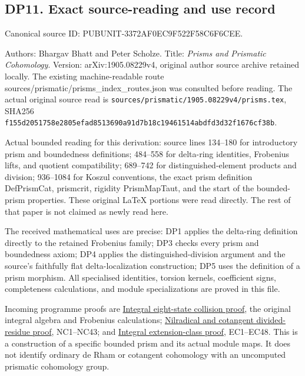 \documentclass[
  10pt,
  a4paper,
]{article}
\begin{document}
\subsection{DP11. Exact source-reading and use
record}\label{dp11.-exact-source-reading-and-use-record}

Canonical source ID: PUBUNIT-3372AF0EC9F522F58C6F6CEE.

Authors: Bhargav Bhatt and Peter Scholze. Title: \emph{Prisms and
Prismatic Cohomology}. Version: arXiv:1905.08229v4, original author
source archive retained locally. The existing machine-readable route
sources/prismatic/prisms\_index\_routes.json was consulted before
reading. The actual original source read is
\texttt{sources/\allowbreak{}prismatic/\allowbreak{}1905.\allowbreak{}08229v4/\allowbreak{}prisms.\allowbreak{}tex}, SHA256
\texttt{f155d205\allowbreak{}1758e280\allowbreak{}5efad851\allowbreak{}3690a91d\allowbreak{}7b18c194\allowbreak{}61514abd\allowbreak{}fd3d32f1\allowbreak{}676cf38b}.

Actual bounded reading for this derivation: source lines 134--180 for
introductory prism and boundedness definitions; 484--558 for delta-ring
identities, Frobenius lifts, and quotient compatibility; 689--742 for
distinguished-element products and division; 936--1084 for Koszul
conventions, the exact prism definition DefPrismCat, prismcrit, rigidity
PrismMapTaut, and the start of the bounded-prism properties. These
original LaTeX portions were read directly. The rest of that paper is
not claimed as newly read here.

The received mathematical uses are precise: DP1 applies the delta-ring
definition directly to the retained Frobenius family; DP3 checks every
prism and boundedness axiom; DP4 applies the distinguished-division
argument and the source's faithfully flat delta-localization
construction; DP5 uses the definition of a prism morphism. All
specialised identities, torsion kernels, coefficient signs, completeness
calculations, and module specializations are proved in this file.

Incoming programme proofs are
\href{https://github.com/KokunoYumeto/zeta-function-research-reader/blob/5a89872598df0902b7c1393cf8e4692ca3010a95/workbenches/splitzero-tandem/branches/tau-zero-prime-positivity/research_calculations/INTEGRAL_EIGHT_STATE_COLLISION_DERIVATION.md}{Integral
eight-state collision proof}, the original integral algebra and
Frobenius calculations;
\href{https://github.com/KokunoYumeto/zeta-function-research-reader/blob/5a89872598df0902b7c1393cf8e4692ca3010a95/workbenches/splitzero-tandem/branches/tau-zero-prime-positivity/research_calculations/NILRADICAL_COTANGENT_DIVIDED_RESIDUE_DERIVATION.md}{Nilradical
and cotangent divided-residue proof}, NC1--NC43; and
\href{NILRADICAL_COTANGENT_EXTENSION_CLASS_DERIVATION.md}{Integral
extension-class proof}, EC1--EC48. This is a construction of a specific
bounded prism and its actual module maps. It does not identify ordinary
de Rham or cotangent cohomology with an uncomputed prismatic cohomology
group.
\end{document}
